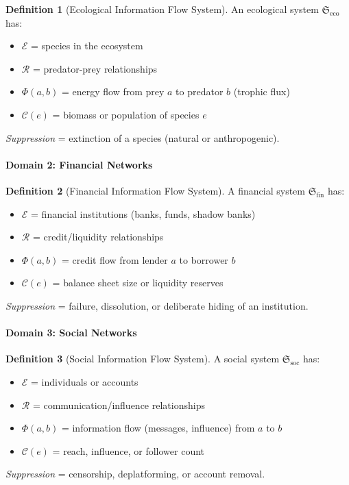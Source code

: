 \documentclass[12pt,a4paper]{article}
\theoremstyle{definition}
\newtheorem{definition}{Definition}[section]
\theoremstyle{remark}
\begin{document}
\begin{definition}[Ecological Information Flow System]
An ecological system $\mathfrak{S}_{\text{eco}}$ has:
\begin{itemize}
    \item $\mathcal{E}$ = species in the ecosystem
    \item $\mathcal{R}$ = predator-prey relationships
    \item $\Phi(a, b)$ = energy flow from prey $a$ to predator $b$ (trophic flux)
    \item $\mathcal{C}(e)$ = biomass or population of species $e$
\end{itemize}
\emph{Suppression} = extinction of a species (natural or anthropogenic).
\end{definition}

\paragraph{Domain 2: Financial Networks}

\begin{definition}[Financial Information Flow System]
A financial system $\mathfrak{S}_{\text{fin}}$ has:
\begin{itemize}
    \item $\mathcal{E}$ = financial institutions (banks, funds, shadow banks)
    \item $\mathcal{R}$ = credit/liquidity relationships
    \item $\Phi(a, b)$ = credit flow from lender $a$ to borrower $b$
    \item $\mathcal{C}(e)$ = balance sheet size or liquidity reserves
\end{itemize}
\emph{Suppression} = failure, dissolution, or deliberate hiding of an institution.
\end{definition}

\paragraph{Domain 3: Social Networks}

\begin{definition}[Social Information Flow System]
A social system $\mathfrak{S}_{\text{soc}}$ has:
\begin{itemize}
    \item $\mathcal{E}$ = individuals or accounts
    \item $\mathcal{R}$ = communication/influence relationships
    \item $\Phi(a, b)$ = information flow (messages, influence) from $a$ to $b$
    \item $\mathcal{C}(e)$ = reach, influence, or follower count
\end{itemize}
\emph{Suppression} = censorship, deplatforming, or account removal.
\end{definition}
\end{document}

